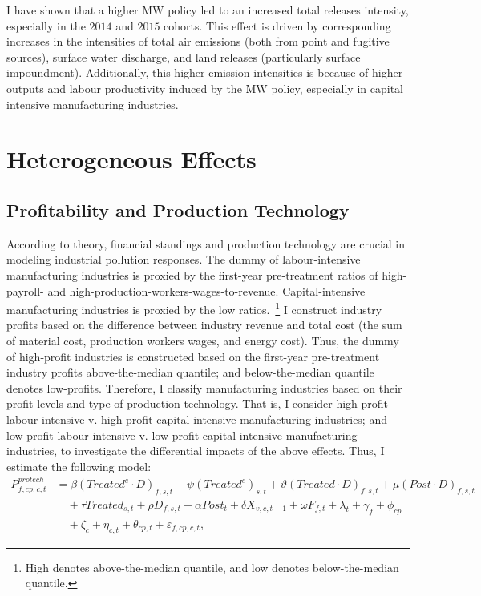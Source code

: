 \documentclass{C:/Users/david/OneDrive/Documents/ULMS/PhD/Thesis/chapter3/src/climate_change/latex/Economic_Journal/OUP-EJ}
\begin{document}
    I have shown that a higher MW policy led to an increased total releases intensity, especially in the $2014$ and $2015$ cohorts. This effect is driven by corresponding increases in the intensities of total air emissions (both from point and fugitive sources), surface water discharge, and land releases (particularly surface impoundment). Additionally, this higher emission intensities is because of higher outputs and labour productivity induced by the MW policy, especially in capital intensive manufacturing industries.


    \section{Heterogeneous Effects}\label{sec:heterogeneous-effects}

    \subsection{Profitability and Production Technology}\label{subsec:profitability-and-production-technology}
    According to theory, financial standings and production technology are crucial in modeling industrial pollution responses. The dummy of labour-intensive manufacturing industries is proxied by the first-year pre-treatment ratios of high-payroll- and high-production-workers-wages-to-revenue. Capital-intensive manufacturing industries is proxied by the low ratios.~\footnote{High denotes above-the-median quantile, and low denotes below-the-median quantile.} I construct industry profits based on the difference between industry revenue and total cost (the sum of material cost, production workers wages, and energy cost). Thus, the dummy of high-profit industries is constructed based on the first-year pre-treatment industry profits above-the-median quantile; and below-the-median quantile denotes low-profits. Therefore, I classify manufacturing industries based on their profit levels and type of production technology. That is, I consider high-profit-labour-intensive v. high-profit-capital-intensive manufacturing industries; and low-profit-labour-intensive v. low-profit-capital-intensive manufacturing industries, to investigate the differential impacts of the above effects. Thus, I estimate the following model:
    \begin{align}
        P_{f,cp,c,t}^{protech} &= \beta (Treated^{e} \cdot D)_{f,s,t} + \psi (Treated^{e})_{s,t} + \vartheta (Treated \cdot D)_{f,s,t} + \mu (Post \cdot D)_{f,s,t} \nonumber \\
        &\quad + \tau Treated_{s,t} + \rho D_{f,s,t} + \alpha Post_{t} + \delta X_{v,c,t-1} + \omega F_{f,t} + \lambda_{t} + \gamma_{f} + \phi_{cp} \nonumber \\
        &\quad + \zeta_{c} + \eta_{c,t} + \theta_{cp,t} + \varepsilon_{f,cp,c,t},\label{eq:heterogeneous-onsite-releases-intensity-protech}
    \end{align}
\end{document}
